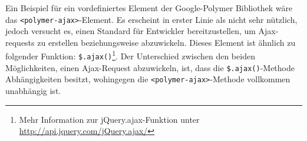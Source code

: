 Ein Beispiel für ein vordefiniertes Element der Google-Polymer Bibliothek wäre das \lstinline|<polymer-ajax>|-Element. Es erscheint in erster Linie als nicht sehr nützlich, jedoch versucht es, einen Standard für Entwickler bereitzustellen, um Ajax-requests zu erstellen beziehungsweise abzuwickeln. Dieses Element ist ähnlich zu folgender Funktion: \lstinline{$.ajax()}\footnote{Mehr Information zur jQuery.ajax-Funktion unter \href{http://api.jquery.com/jQuery.ajax/}{http://api.jquery.com/jQuery.ajax/}}. Der Unterschied zwischen den beiden Möglichkeiten, einen Ajax-Request abzuwickeln, ist, dass die \lstinline{$.ajax()}-Methode Abhängigkeiten besitzt, wohingegen die \lstinline|<polymer-ajax>|-Methode vollkommen unabhängig ist.

